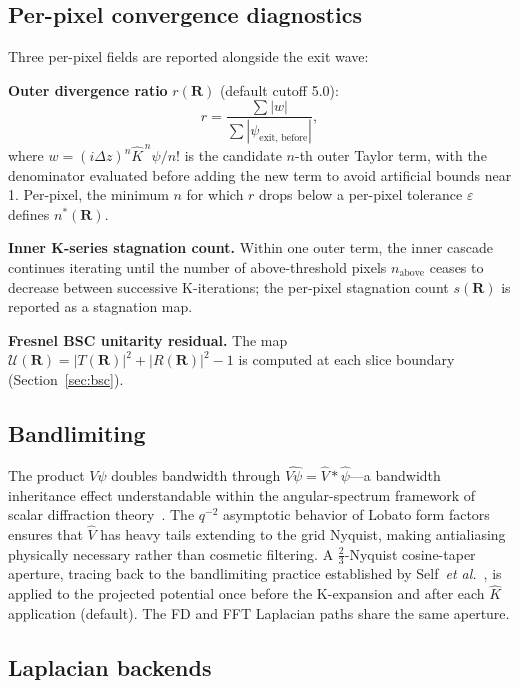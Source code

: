 \documentclass[twoside,11pt]{article}
\begin{document}
\subsection{Per-pixel convergence diagnostics}

Three per-pixel fields are reported alongside the exit wave:

\textbf{Outer divergence ratio} $r(\mathbf{R})$ (default cutoff 5.0):
\begin{equation}\label{eq:divergence-ratio}
r=\frac{\sum|w|}{\sum|\psi_{\text{exit, before}}|},
\end{equation}
where $w=(i\Delta z)^n\hat{K}^{\,n}\psi/n!$ is the candidate $n$-th outer Taylor term, with the denominator evaluated before adding the new term to avoid artificial bounds near 1. Per-pixel, the minimum $n$ for which $r$ drops below a per-pixel tolerance $\varepsilon$ defines $n^*(\mathbf{R})$.

\textbf{Inner K-series stagnation count.} Within one outer term, the inner cascade continues iterating until the number of above-threshold pixels $n_\text{above}$ ceases to decrease between successive K-iterations; the per-pixel stagnation count $s(\mathbf{R})$ is reported as a stagnation map.

\textbf{Fresnel BSC unitarity residual.} The map $\mathcal{U}(\mathbf{R})=|T(\mathbf{R})|^2+|R(\mathbf{R})|^2-1$ is computed at each slice boundary (Section~\ref{sec:bsc}).

\subsection{Bandlimiting}\label{sec:bandlimiting}

The product $V\psi$ doubles bandwidth through $\widehat{V\psi}=\hat V*\hat\psi$---a bandwidth inheritance effect understandable within the angular-spectrum framework of scalar diffraction theory~\cite{Goodman2017}. The $q^{-2}$ asymptotic behavior of Lobato form factors~\cite{LobatoVanDyck2014} ensures that $\hat V$ has heavy tails extending to the grid Nyquist, making antialiasing physically necessary rather than cosmetic filtering. A $\tfrac23$-Nyquist cosine-taper aperture, tracing back to the bandlimiting practice established by Self~\textit{et al.}~\cite{Self1983}, is applied to the projected potential once before the K-expansion and after each $\hat{K}$ application (default). The FD and FFT Laplacian paths share the same aperture.

\subsection{Laplacian backends}\label{sec:laplacian}
\end{document}
